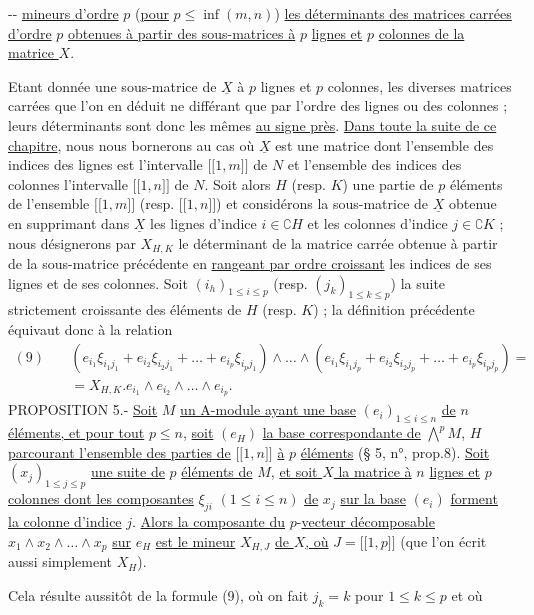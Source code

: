 --
\uline{mineurs d’ordre} $p$ (\uline{pour} $p\leq\inf(m,n)$) \uline{les déterminants des matrices carrées d’ordre} $p$ \uline{obtenues à partir des sous-matrices à} $p$ \uline{lignes et} $p$ \uline{colonnes de la matrice $X$}.

Etant donnée une sous-matrice de $\underline X$ à $p$ lignes et $p$ colonnes, les diverses matrices carrées que l’on en déduit ne différant que par l’ordre des lignes ou des colonnes ; leurs déterminants sont donc les mêmes \uline{au signe près}. \uline{Dans toute la suite de ce chapitre}, nous nous bornerons au cas où $\underline X$ est une matrice dont l’ensemble des indices des lignes est l’intervalle $\lbrack\!\lbrack1,m\rbrack\!\rbrack$ de $N$ et l’ensemble des indices des colonnes l’intervalle $\lbrack\!\lbrack1,n\rbrack\!\rbrack$ de $N$. Soit alors $H$ (resp. $K$) une partie de $p$ éléments de l’ensemble $\lbrack\!\lbrack1,m\rbrack\!\rbrack$ (resp. $\lbrack\!\lbrack1,n\rbrack\!\rbrack$) et considérons la sous-matrice de $\underline X$ obtenue en supprimant dans $\underline X$ les lignes d’indice $i\in\complement H$ et les colonnes d’indice $j\in\complement K$ ; nous désignerons par $X_{H,K}$ le déterminant de la matrice carrée obtenue à partir de la sous-matrice précédente en \uline{rangeant par ordre croissant} les indices de ses lignes et de ses colonnes. Soit $(i_h)_{1\leq i\leq p}$ (resp. $(j_k)_{1\leq k\leq p}$) la suite strictement croissante des éléments de $H$ (resp. $K$) ; la définition précédente équivaut donc à la relation
\[
\begin{split}
(9)\quad &(e_{i_1}\xi_{i_1j_1}+e_{i_2}\xi_{i_2j_1}+\ldots+e_{i_p}\xi_{i_pj_1})\wedge\ldots\wedge(e_{i_1}\xi_{i_1j_p}+e_{i_2}\xi_{i_2j_p}+\ldots+e_{i_p}\xi_{i_pj_p})=\\
&=X_{H,K}.e_{i_1}\wedge e_{i_2}\wedge\ldots\wedge e_{i_p}.
\end{split}
\]
PROPOSITION 5.- \uline{Soit} $M$ \uline{un A-module ayant une base} $(e_i)_{1\leq i\leq n}$ \uline{de} $n$ \uline{éléments, et pour tout} $p\leq n$, \uline{soit} $(e_H)$ \uline{la base correspondante de} $\bigwedge^pM$, $H$ \uline{parcourant l’ensemble des parties de} $\lbrack\!\lbrack1,n\rbrack\!\rbrack$ \uline{à} $p$ \uline{éléments} (§ 5, n°, prop.8). \uline{Soit} $(x_j)_{1\leq j\leq p}$ \uline{une suite de} $p$ \uline{éléments de} $M$, \uline{et soit $X$ la matrice à} $n$ \uline{lignes et} $p$ \uline{colonnes dont les composantes} $\xi_{ji}$ $(1\leq i\leq n)$ \uline{de} $x_j$ \uline{sur la base} $(e_i)$ \uline{forment la colonne d’indice} $j$. \uline{Alors la composante du} $p$-\uline{vecteur décomposable} $x_1\wedge x_2\wedge\ldots\wedge x_p$ \uline{sur} $e_H$ \uline{est le mineur} $X_{H,J}$ \uline{de $X$, où} $J=\lbrack\!\lbrack1,p\rbrack\!\rbrack$ (que l’on écrit aussi simplement $X_H$).

Cela résulte aussitôt de la formule (9), où on fait $j_k=k$ pour $1\leq k\leq p$ et où
